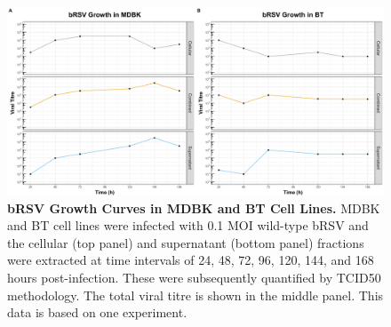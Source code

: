 \begin{figure}
    \centering
    \includegraphics[width=1\linewidth]{07. Chapter 2/Figs/01. Technologies/01. growth_curves.pdf}
    \caption[bRSV Growth Curves in MDBK and BT Cell Lines.]{\textbf{bRSV Growth Curves in MDBK and BT Cell Lines.} MDBK and BT cell lines were infected with 0.1 MOI wild-type bRSV and the cellular (top panel) and supernatant (bottom panel) fractions were extracted at time intervals of 24, 48, 72, 96, 120, 144, and 168 hours post-infection. These were subsequently quantified by TCID50 methodology. The total viral titre is shown in the middle panel. This data is based on one experiment.}
    \label{fig:bRSV growth curves in MDBK and BT cell lines}
\end{figure}



